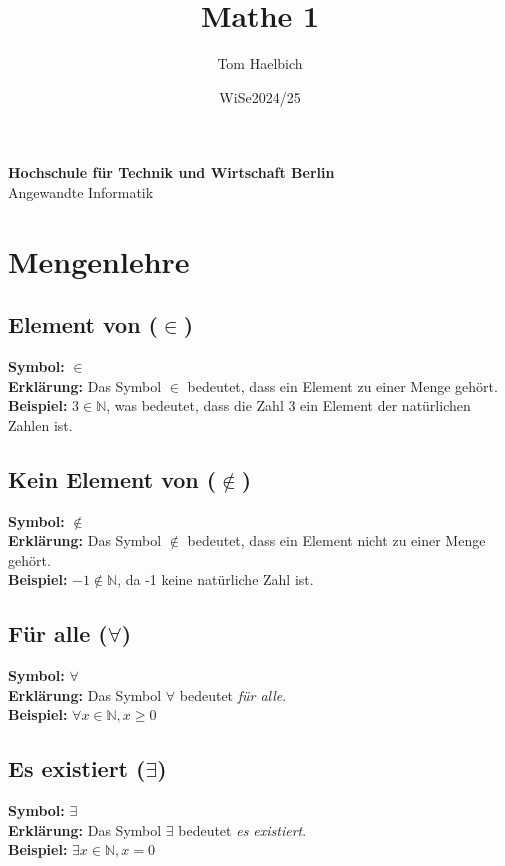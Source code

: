 \documentclass[12pt,a4paper]{article}
\begin{document}
\title{Mathe 1}
\author{Tom Haelbich}
\date{WiSe2024/25}

\maketitle
\begin{center}
    \textbf{Hochschule für Technik und Wirtschaft Berlin} \\
    Angewandte Informatik
\end{center}


\tableofcontents
\newpage

\section{Mengenlehre}

\subsection{Element von (\texorpdfstring{$\in$}{in})}
\textbf{Symbol:} $\in$ \\
\textbf{Erklärung:} Das Symbol $\in$ bedeutet, dass ein Element zu einer Menge gehört. \\
\textbf{Beispiel:} $3 \in \mathbb{N}$, was bedeutet, dass die Zahl 3 ein Element der natürlichen Zahlen ist.

\subsection{Kein Element von (\texorpdfstring{$\notin$}{notin})}
\textbf{Symbol:} $\notin$ \\
\textbf{Erklärung:} Das Symbol $\notin$ bedeutet, dass ein Element nicht zu einer Menge gehört. \\
\textbf{Beispiel:} $-1 \notin \mathbb{N}$, da -1 keine natürliche Zahl ist.

\subsection{Für alle (\texorpdfstring{$\forall$}{forall})}
\textbf{Symbol:} $\forall$ \\
\textbf{Erklärung:} Das Symbol $\forall$ bedeutet \textit{für alle}. \\
\textbf{Beispiel:} $\forall x \in \mathbb{N}, x \geq 0$

\subsection{Es existiert (\texorpdfstring{$\exists$}{exists})}
\textbf{Symbol:} $\exists$ \\
\textbf{Erklärung:} Das Symbol $\exists$ bedeutet \textit{es existiert}. \\
\textbf{Beispiel:} $\exists x \in \mathbb{N}, x = 0$
\end{document}
